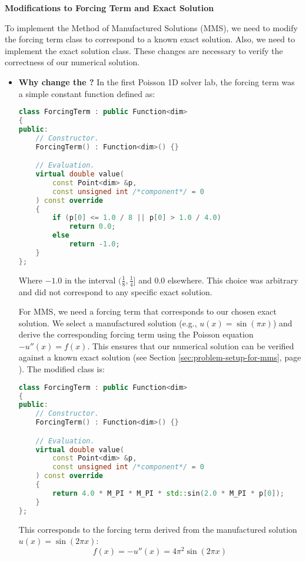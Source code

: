\begin{flushleft}
    \textcolor{Green3}{ \textbf{Modifications to Forcing Term and Exact Solution}}
\end{flushleft}
To implement the Method of Manufactured Solutions (MMS), we need to modify the forcing term class to correspond to a known exact solution. Also, we need to implement the exact solution class. These changes are necessary to verify the correctness of our numerical solution.
\begin{itemize}
    \item[\textcolor{Green3}{\faIcon{question-circle}}] \textcolor{Green3}{\textbf{Why change the ?}} In the first Poisson 1D solver lab, the forcing term was a simple constant function defined as:
    \begin{lstlisting}[language=C++, caption={Original Forcing Term}]
class ForcingTerm : public Function<dim>
{
public:
    // Constructor.
    ForcingTerm() : Function<dim>() {}

    // Evaluation.
    virtual double value(
        const Point<dim> &p,
        const unsigned int /*component*/ = 0
    ) const override
    {
        if (p[0] <= 1.0 / 8 || p[0] > 1.0 / 4.0) 
            return 0.0;
        else 
            return -1.0;
    }
};\end{lstlisting}
    Where $-1.0$ in the interval $(\frac{1}{8}, \frac{1}{4}]$ and $0.0$ elsewhere. This choice was arbitrary and did not correspond to any specific exact solution.
    
    For MMS, we need a forcing term that corresponds to our chosen exact solution. We select a manufactured solution (e.g., $u(x) = \sin(\pi x)$) and derive the corresponding forcing term using the Poisson equation $-u''(x) = f(x)$. This ensures that our numerical solution can be verified against a known exact solution (see Section \ref{sec:problem-setup-for-mms}, page \pageref{sec:problem-setup-for-mms}). The modified  class is:
    \begin{lstlisting}[language=C++, caption={Modified Forcing Term for MMS}]
class ForcingTerm : public Function<dim>
{
public:
    // Constructor.
    ForcingTerm() : Function<dim>() {}

    // Evaluation.
    virtual double value(
        const Point<dim> &p,
        const unsigned int /*component*/ = 0
    ) const override
    {
        return 4.0 * M_PI * M_PI * std::sin(2.0 * M_PI * p[0]);
    }
};\end{lstlisting}
    This corresponds to the forcing term derived from the manufactured solution $u(x) = \sin(2\pi x)$:
    \begin{equation*}
        f(x) = -u''(x) = 4\pi^2 \sin(2\pi x)
    \end{equation*}



\end{itemize}
